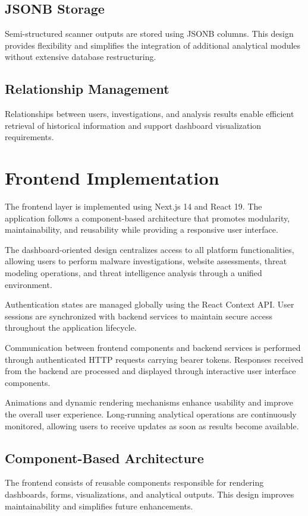 \subsection{JSONB Storage}
Semi-structured scanner outputs are stored using JSONB columns. This design provides flexibility and simplifies the integration of additional analytical modules without extensive database restructuring.

\subsection{Relationship Management}
Relationships between users, investigations, and analysis results enable efficient retrieval of historical information and support dashboard visualization requirements.

\section{Frontend Implementation}
The frontend layer is implemented using Next.js 14 and React 19. The application follows a component-based architecture that promotes modularity, maintainability, and reusability while providing a responsive user interface.

The dashboard-oriented design centralizes access to all platform functionalities, allowing users to perform malware investigations, website assessments, threat modeling operations, and threat intelligence analysis through a unified environment.

Authentication states are managed globally using the React Context API. User sessions are synchronized with backend services to maintain secure access throughout the application lifecycle.

Communication between frontend components and backend services is performed through authenticated HTTP requests carrying bearer tokens. Responses received from the backend are processed and displayed through interactive user interface components.

Animations and dynamic rendering mechanisms enhance usability and improve the overall user experience. Long-running analytical operations are continuously monitored, allowing users to receive updates as soon as results become available.

\subsection{Component-Based Architecture}
The frontend consists of reusable components responsible for rendering dashboards, forms, visualizations, and analytical outputs. This design improves maintainability and simplifies future enhancements.

